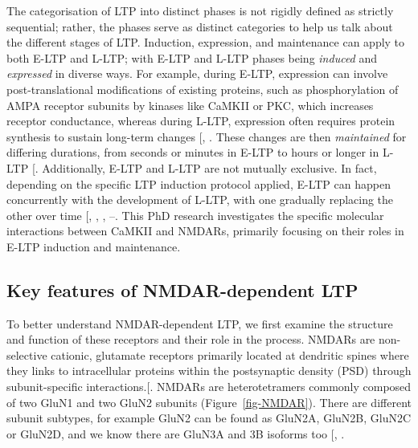 \documentclass[
  11pt,
  letterpaper,
]{scrreprt}
\begin{document}
The categorisation of LTP into distinct phases is not rigidly defined as
strictly sequential; rather, the phases serve as distinct categories to
help us talk about the different stages of LTP. Induction, expression,
and maintenance can apply to both E-LTP and L-LTP; with E-LTP and L-LTP
phases being \emph{induced} and \emph{expressed} in diverse ways. For
example, during E-LTP, expression can involve post-translational
modifications of existing proteins, such as phosphorylation of AMPA
receptor subunits by kinases like CaMKII or PKC, which increases
receptor conductance, whereas during L-LTP, expression often requires
protein synthesis to sustain long-term changes
{[},
\citeproc{ref-pfeiffer2006Current}{105}{]}. These changes are then
\emph{maintained} for differing durations, from seconds or minutes in
E-LTP to hours or longer in L-LTP
{[}\citeproc{ref-abraham2003Properties}{106}{]}. Additionally, E-LTP and
L-LTP are not mutually exclusive. In fact, depending on the specific LTP
induction protocol applied, E-LTP can happen concurrently with the
development of L-LTP, with one gradually replacing the other over time
{[},
,
,
--\citeproc{ref-nicoll2003Expression}{109}{]}.
This PhD research investigates the specific molecular interactions
between CaMKII and NMDARs, primarily focusing on their roles in E-LTP
induction and maintenance.

\subsection{Key features of NMDAR-dependent
LTP}\label{key-features-of-nmdar-dependent-ltp}

To better understand NMDAR-dependent LTP, we first examine the structure
and function of these receptors and their role in the process. NMDARs
are non-selective cationic, glutamate receptors primarily located at
dendritic spines where they links to intracellular proteins within the
postsynaptic density (PSD) through subunit-specific
interactions.{[}\citeproc{ref-volianskis2015LongtermPotentiationRole}{110}{]}.
NMDARs are heterotetramers commonly composed of two GluN1 and two GluN2
subunits (Figure~\ref{fig-NMDAR}). There are different subunit subtypes,
for example GluN2 can be found as GluN2A, GluN2B, GluN2C or GluN2D, and
we know there are GluN3A and 3B isoforms too
{[},
\citeproc{ref-kvist2013StructurebasedDiscoveryAntagonists}{112}{]}.
\end{document}

